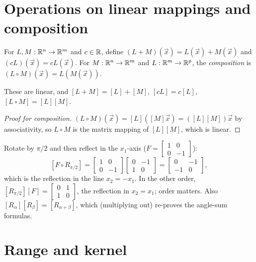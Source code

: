 \section{Operations on linear mappings and composition}

\begin{definition}
For $L,M:\mathbb{R}^n\to\mathbb{R}^m$ and $c\in\mathbb{R}$, define $(L+M)(\vec x)=L(\vec x)+M(\vec x)$ and
$(cL)(\vec x)=cL(\vec x)$. For $M:\mathbb{R}^n\to\mathbb{R}^m$ and $L:\mathbb{R}^m\to\mathbb{R}^p$, the \emph{composition} is
$(L\circ M)(\vec x)=L(M(\vec x))$.
\end{definition}

\begin{theorem}
These are linear, and $[L+M]=[L]+[M]$, $[cL]=c[L]$, $[L\circ M]=[L][M]$.
\end{theorem}
\begin{proof}[Proof for composition]
$(L\circ M)(\vec x)=[L]([M]\vec x)=([L][M])\vec x$ by associativity, so $L\circ M$ is the matrix
mapping of $[L][M]$, which is linear.
\end{proof}

\begin{example}
Rotate by $\pi/2$ and then reflect in the $x_1$-axis ($F=\begin{bmatrix}1&0\\0&-1\end{bmatrix}$):
\[
  [F\circ R_{\pi/2}] = \begin{bmatrix}1&0\\0&-1\end{bmatrix}\begin{bmatrix}0&-1\\1&0\end{bmatrix}
  = \begin{bmatrix}0&-1\\-1&0\end{bmatrix},
\]
which is the reflection in the line $x_2=-x_1$. In the other order,
$[R_{\pi/2}][F]=\begin{bmatrix}0&1\\1&0\end{bmatrix}$, the reflection in $x_2=x_1$; order matters.
Also $[R_\alpha][R_\beta]=[R_{\alpha+\beta}]$, which (multiplying out) re-proves the angle-sum formulas.
\end{example}

\section{Range and kernel}

